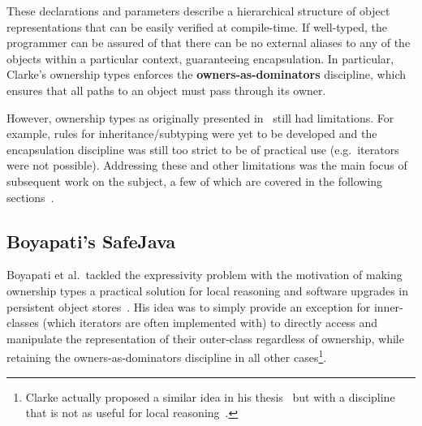 \documentclass{acm_proc_article-sp}
\begin{document}
These declarations and parameters describe a hierarchical structure of object
representations that can be easily verified at compile-time. If well-typed, the
programmer can be assured of that there can be no external aliases to any of
the objects within a particular context, guaranteeing encapsulation. In
particular, Clarke's ownership types enforces the \textbf{owners-as-dominators}
discipline, which ensures that all paths to an object must pass through its
owner.

However, ownership types as originally presented in~\cite{clarke98ownership}
still had limitations. For example, rules for inheritance/subtyping were yet to
be developed and the encapsulation discipline was still too strict to be of
practical use (e.g.\ iterators were not possible). Addressing these and other
limitations was the main focus of subsequent work on the subject, a few of
which are covered in the following sections~\cite{boyapati04safejava,
boyapati03innerclass, cunningham08ut, dietl11gut, cameron07mojo}.

%
%
%


\subsection{Boyapati's SafeJava}
\label{subsec:boyapati}

Boyapati et al.\ tackled the expressivity problem with the motivation of making
ownership types a practical solution for local reasoning and software upgrades
in persistent object stores~\cite{boyapati03innerclass}. His idea was to simply
provide an exception for inner-classes (which iterators are often implemented
with) to directly access and manipulate the representation of their outer-class
regardless of ownership, while retaining the owners-as-dominators discipline in
all other cases\footnote{Clarke actually proposed a similar idea in his
thesis~\cite{clarke03ownership} but with a discipline that is not as useful for
local reasoning~\cite{boyapati03innerclass}.}.
\end{document}
